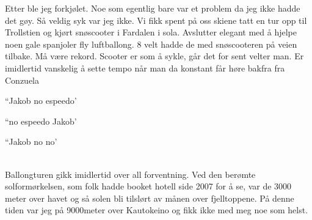 Etter
ble jeg forkjølet. Noe som egentlig bare var et problem da jeg ikke
hadde det gøy. Så veldig syk var jeg ikke. Vi fikk spent på oss skiene
tatt en tur opp til Trollstien og kjørt snøscooter
i Fardalen i sola. Avslutter elegant med å  hjelpe noen gale spanjoler
fly luftballong. 8 velt hadde de med snøscooteren på veien tilbake. Må
være rekord. Scooter er som å sykle, går det for sent velter man. Er
imidlertid vanskelig å sette tempo når man da konstant får høre
bakfra fra Conzuela
\begin{dialogue}
	\item ``Jakob no espeedo'
	\item ``no espeedo Jakob'
	\item ``Jakob no no'
\end{dialogue}
\\

Ballongturen gikk imidlertid over all forventning. Ved den berømte
solformørkelsen, som folk hadde booket hotell side 2007 for å se, var
de 3000 meter over havet og så solen bli tilslørt av månen over
fjelltoppene. På denne tiden var
jeg på 9000meter over Kautokeino og fikk ikke med meg noe som helst. 

